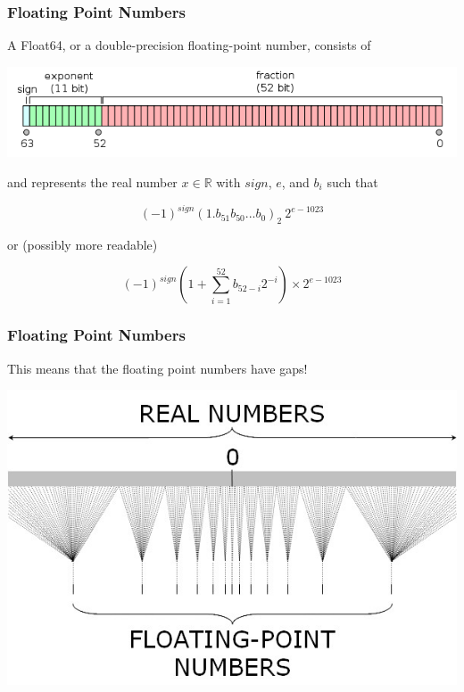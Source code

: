 \documentclass{beamer}
\def\R{\mathbb{R}}                     %
\begin{document}
\begin{frame}

\frametitle{Floating Point Numbers}

A Float64, or a double-precision floating-point number, consists of

\includegraphics[scale=.4]{float-format.png}

and represents the real number $x \in \R$ with $sign$, $e$, and $b_i$ such that

\[ (-1)^{sign} (1.b_{51}b_{50}...b_{0})_2 \ 2^{e-1023} \]

or (possibly more readable)

\[ (-1)^{sign} \left ( 1 + \sum_{i=1}^{52} b_{52-i} 2^{-i} \right ) \times 2^{e-1023} \]

\end{frame}

\begin{frame}

\frametitle{Floating Point Numbers}

This means that the floating point numbers have gaps!

\includegraphics[scale=.4]{float-gaps.jpg}

\end{frame}
\end{document}
